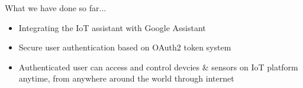\documentclass[10pt, a4paper]{beamer}
\begin{document}
\begin{frame}{What we have done so far...}
	\begin{minipage}[b]{0.55\textwidth}
		\raggedright
		\begin{itemize}
			\item Integrating the IoT assistant with Google Assistant
			\newline\\\vspace{0.2cm}
			\item Secure user authentication based on OAuth2 token system
			\newline\\\vspace{0.2cm}
			\item Authenticated user can access and control devcies \& sensors on IoT platform anytime, from anywhere around the world through internet
		\end{itemize}
		\vspace{0.3cm}
	\end{minipage}%
	\begin{minipage}[b]{0.45\textwidth}
		\centering

\end{minipage}
\end{frame}
\end{document}

